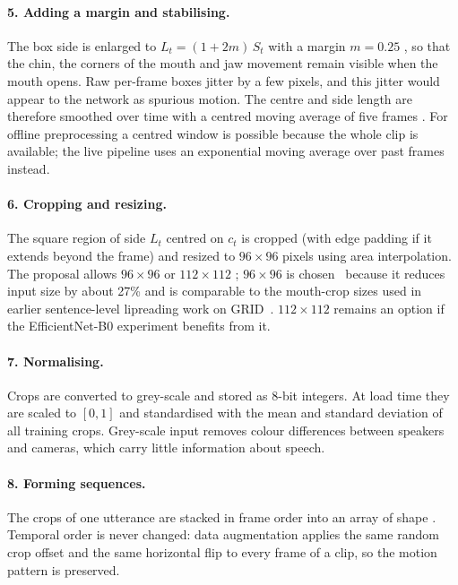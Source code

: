 \paragraph{5. Adding a margin and stabilising.} The box side is enlarged to
$L_t = (1+2m)\,S_t$ with a margin $m = 0.25$ \rec, so that the chin, the corners
of the mouth and jaw movement remain visible when the mouth opens. Raw
per-frame boxes jitter by a few pixels, and this jitter would appear to the
network as spurious motion. The centre and side length are therefore smoothed
over time with a centred moving average of five frames \rec. For offline
preprocessing a centred window is possible because the whole clip is
available; the live pipeline uses an exponential moving average over past
frames instead.

\paragraph{6. Cropping and resizing.} The square region of side $L_t$ centred
on $c_t$ is cropped (with edge padding if it extends beyond the frame) and
resized to $96 \times 96$ pixels using area interpolation. The proposal allows
$96\times96$ or $112\times112$ \spec; $96\times96$ is chosen \rec\ because it
reduces input size by about 27\% and is comparable to the mouth-crop sizes used
in earlier sentence-level lipreading work on GRID~\cite{assael2016}. $112\times112$ remains an
option if the EfficientNet-B0 experiment benefits from it.

\paragraph{7. Normalising.} Crops are converted to grey-scale and stored as
8-bit integers. At load time they are scaled to $[0,1]$ and standardised with
the mean and standard deviation of all training crops. Grey-scale input
removes colour differences between speakers and cameras, which carry little
information about speech.

\paragraph{8. Forming sequences.} The crops of one utterance are stacked in
frame order into an array of shape . Temporal order is never
changed: data augmentation applies the same random crop offset and the same
horizontal flip to every frame of a clip, so the motion pattern is preserved.

